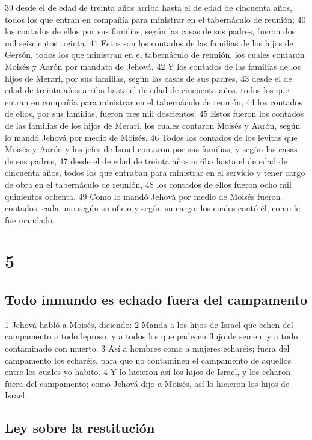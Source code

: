 39 desde el de edad de treinta años arriba hasta el de edad de cincuenta años, todos los que entran en compañía para ministrar en el tabernáculo de reunión;
40 los contados de ellos por sus familias, según las casas de sus padres, fueron dos mil seiscientos treinta.
41 Estos son los contados de las familias de los hijos de Gersón, todos los que ministran en el tabernáculo de reunión, los cuales contaron Moisés y Aarón por mandato de Jehová.
42 Y los contados de las familias de los hijos de Merari, por sus familias, según las casas de sus padres,
43 desde el de edad de treinta años arriba hasta el de edad de cincuenta años, todos los que entran en compañía para ministrar en el tabernáculo de reunión;
44 los contados de ellos, por sus familias, fueron tres mil doscientos.
45 Estos fueron los contados de las familias de los hijos de Merari, los cuales contaron Moisés y Aarón, según lo mandó Jehová por medio de Moisés.
46 Todos los contados de los levitas que Moisés y Aarón y los jefes de Israel contaron por sus familias, y según las casas de sus padres,
47 desde el de edad de treinta años arriba hasta el de edad de cincuenta años, todos los que entraban para ministrar en el servicio y tener cargo de obra en el tabernáculo de reunión,
48 los contados de ellos fueron ocho mil quinientos ochenta.
49 Como lo mandó Jehová por medio de Moisés fueron contados, cada uno según su oficio y según su cargo; los cuales contó él, como le fue mandado.

\chapter{5}

\section*{Todo inmundo es echado fuera del campamento}

1 Jehová habló a Moisés, diciendo:
2 Manda a los hijos de Israel que echen del campamento a todo leproso, y a todos los que padecen flujo de semen, y a todo contaminado con muerto.
3 Así a hombres como a mujeres echaréis; fuera del campamento los echaréis, para que no contaminen el campamento de aquellos entre los cuales yo habito.
4 Y lo hicieron así los hijos de Israel, y los echaron fuera del campamento; como Jehová dijo a Moisés, así lo hicieron los hijos de Israel.

\section*{Ley sobre la restitución}

